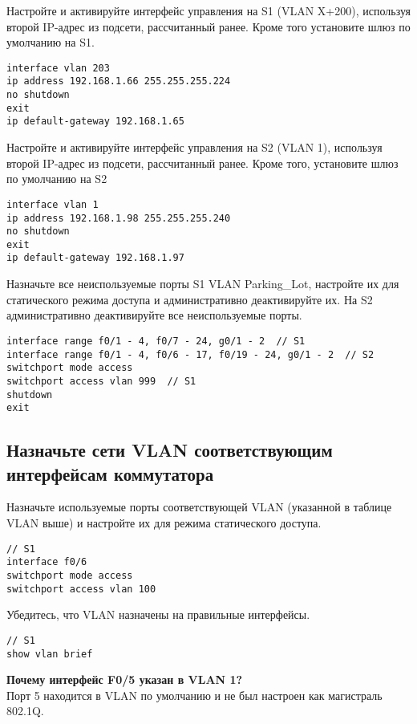 Настройте и активируйте интерфейс управления на S1 (VLAN X+200),
используя второй IP-адрес из подсети, рассчитанный ранее.
Кроме того установите шлюз по умолчанию на S1.

\begin{verbatim}
interface vlan 203
ip address 192.168.1.66 255.255.255.224
no shutdown
exit
ip default-gateway 192.168.1.65
\end{verbatim}

Настройте и активируйте интерфейс управления на S2 (VLAN 1),
используя второй IP-адрес из подсети, рассчитанный ранее.
Кроме того, установите шлюз по умолчанию на S2

\begin{verbatim}
interface vlan 1
ip address 192.168.1.98 255.255.255.240
no shutdown
exit
ip default-gateway 192.168.1.97
\end{verbatim}

Назначьте все неиспользуемые порты S1 VLAN Parking\_Lot,
настройте их для статического режима доступа
и административно деактивируйте их.
На S2 административно деактивируйте все неиспользуемые порты.

\begin{verbatim}
interface range f0/1 - 4, f0/7 - 24, g0/1 - 2  // S1
interface range f0/1 - 4, f0/6 - 17, f0/19 - 24, g0/1 - 2  // S2
switchport mode access
switchport access vlan 999  // S1
shutdown
exit
\end{verbatim}

\subsection{Назначьте сети VLAN соответствующим интерфейсам коммутатора}

Назначьте используемые порты соответствующей VLAN
(указанной в таблице VLAN выше)
и настройте их для режима статического доступа.

\begin{verbatim}
// S1
interface f0/6
switchport mode access
switchport access vlan 100
\end{verbatim}


Убедитесь, что VLAN назначены на правильные интерфейсы.

\begin{verbatim}
// S1
show vlan brief
\end{verbatim}

\textbf{Почему интерфейс F0/5 указан в VLAN 1?}\\
Порт 5 находится в VLAN по умолчанию и не был настроен как магистраль 802.1Q.

